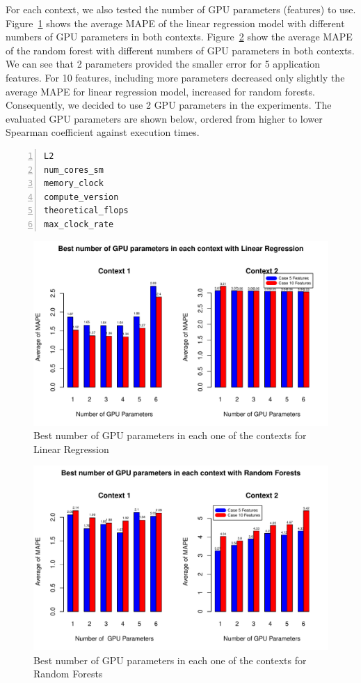 For each context, we also tested the number of GPU parameters (features) to use. Figure~\ref{fig:GPUParam} shows the average MAPE of the linear regression model with different numbers of GPU parameters in both contexts. Figure~\ref{fig:GPUParam-RF} show the average MAPE of the random forest with different numbers of GPU parameters in both contexts. We can see that 2 parameters provided the smaller error for 5 application features. For 10 features, including more parameters decreased only slightly the average MAPE for linear regression model, increased for random forests. Consequently, we decided to use 2 GPU parameters in the experiments. The evaluated GPU parameters are shown below, ordered from higher to lower Spearman coefficient against execution times.

\begin{lstlisting}[basicstyle=\small, numbers=left, stepnumber=1]
L2
num_cores_sm
memory_clock
compute_version
theoretical_flops
max_clock_rate
\end{lstlisting}

\begin{figure}[htpb]
    \centering
    \includegraphics[scale=.75]{./images/parameters.pdf}
    \caption{Best number of GPU parameters in each one of the contexts for Linear Regression}
    \label{fig:GPUParam}
\end{figure}

 
\begin{figure}[htpb]
    \centering
    \includegraphics[scale=.75]{./images/parameters-RF.pdf}
    \caption{Best number of GPU parameters in each one of the contexts for Random Forests}
    \label{fig:GPUParam-RF}
\end{figure}



